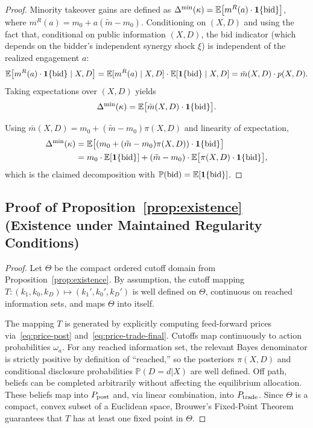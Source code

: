 \documentclass[11pt]{article}
\newcommand{\E}{\mathbb{E}}
\newcommand{\PP}{\mathbb{P}}
\newcommand{\1}{\mathbf{1}}
\begin{document}
\begin{proof}
  Minority takeover gains are defined as $\Delta^{\min}(\kappa)=\E\big[m^{R}(a)\cdot \1\{\textup{bid}\}\big]$, where $m^R(a)=m_0+a(\tilde m - m_0)$.
  Conditioning on $(X,D)$ and using the fact that, conditional on public information $(X,D)$, the bid indicator (which depends on the bidder's independent synergy shock $\xi$) is independent of the realized engagement $a$:
  \[
  \E\big[m^{R}(a)\cdot \1\{\textup{bid}\}\mid X,D\big]
  =\E[m^{R}(a)\mid X,D]\cdot \E[\1\{\textup{bid}\}\mid X,D]
  =\bar m(X,D)\cdot p(X,D).
  \]
  Taking expectations over $(X,D)$ yields
  \[
  \Delta^{\min}(\kappa)=\E\big[\bar m(X,D)\cdot \1\{\textup{bid}\}\big].
  \]

  Using $\bar{m}(X,D)=m_0+(\tilde{m}-m_0)\pi(X,D)$ and linearity of expectation,
  \begin{align*}
  \Delta^{\min}(\kappa)
  &=\E\big[(m_0+(\tilde{m}-m_0)\pi(X,D))\cdot \1\{\textup{bid}\}\big] \\
  &=m_0\cdot \E[\1\{\textup{bid}\}] + (\tilde{m}-m_0)\cdot \E\big[\pi(X,D)\cdot \1\{\textup{bid}\}\big],
  \end{align*}
  which is the claimed decomposition with $\PP(\textup{bid})=\E[\1\{\textup{bid}\}]$.
\end{proof}

\subsection{Proof of Proposition~\ref{prop:existence} (Existence under Maintained Regularity Conditions)}
\label{app:proof-existence}

\begin{proof}
Let $\Theta$ be the compact ordered cutoff domain from Proposition~\ref{prop:existence}. By assumption, the cutoff mapping $T:(k_1,k_0,k_D)\mapsto (k_1',k_0',k_D')$ is well defined on $\Theta$, continuous on reached information sets, and maps $\Theta$ into itself.

The mapping $T$ is generated by explicitly computing feed-forward prices via~\eqref{eq:price-post} and~\eqref{eq:price-trade-final}. Cutoffs map continuously to action probabilities $\omega_a$. For any reached information set, the relevant Bayes denominator is strictly positive by definition of ``reached,'' so the posteriors $\pi(X,D)$ and conditional disclosure probabilities $\PP(D=d|X)$ are well defined. Off path, beliefs can be completed arbitrarily without affecting the equilibrium allocation. These beliefs map into $P_{\textup{post}}$ and, via linear combination, into $P_{\textup{trade}}$. Since $\Theta$ is a compact, convex subset of a Euclidean space, Brouwer's Fixed-Point Theorem guarantees that $T$ has at least one fixed point in $\Theta$.
\end{proof}
\end{document}
